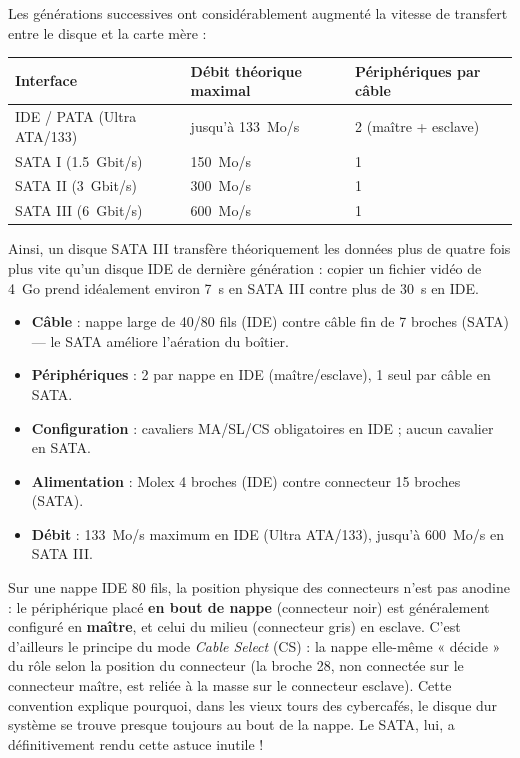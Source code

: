 \documentclass[11pt]{article}
\newcounter{popsec}
\newcounter{popsub}
\newcommand{\courssub}[1]{%
  \stepcounter{popsub}%
  \par\vspace{9pt}\noindent{\popxbold\fontsize{11.5}{13}\selectfont\color{popink}{\color{poporange}\thepopsec.\thepopsub}\hspace{6pt}#1}\par\nopagebreak\vspace{4pt}
}
\begin{document}
\begin{exemplebox}
Les générations successives ont considérablement augmenté la vitesse de transfert entre le disque et la carte mère :
\begin{center}
\begin{tabularx}{\linewidth}{|l|X|l|}
\hline
\rowcolor{popblueL} \textbf{Interface} & \textbf{Débit théorique maximal} & \textbf{Périphériques par câble} \\
\hline
IDE / PATA (Ultra ATA/133) & jusqu'à \SI{133}{Mo/s} & 2 (maître + esclave) \\
\hline
SATA I (\SI{1,5}{Gbit/s}) & \SI{150}{Mo/s} & 1 \\
\hline
SATA II (\SI{3}{Gbit/s}) & \SI{300}{Mo/s} & 1 \\
\hline
SATA III (\SI{6}{Gbit/s}) & \SI{600}{Mo/s} & 1 \\
\hline
\end{tabularx}
\end{center}
Ainsi, un disque SATA III transfère théoriquement les données plus de quatre fois plus vite qu'un disque IDE de dernière génération : copier un fichier vidéo de \SI{4}{Go} prend idéalement environ \SI{7}{s} en SATA III contre plus de \SI{30}{s} en IDE.
\end{exemplebox}

\courssub{Comparaison synthétique IDE / SATA}

\begin{aretenir}
\begin{itemize}
\item \textbf{Câble} : nappe large de 40/80 fils (IDE) contre câble fin de 7 broches (SATA) — le SATA améliore l'aération du boîtier.
\item \textbf{Périphériques} : 2 par nappe en IDE (maître/esclave), 1 seul par câble en SATA.
\item \textbf{Configuration} : cavaliers MA/SL/CS obligatoires en IDE ; aucun cavalier en SATA.
\item \textbf{Alimentation} : Molex 4 broches (IDE) contre connecteur 15 broches (SATA).
\item \textbf{Débit} : \SI{133}{Mo/s} maximum en IDE (Ultra ATA/133), jusqu'à \SI{600}{Mo/s} en SATA III.
\end{itemize}
\end{aretenir}

\begin{savaistu}
Sur une nappe IDE 80 fils, la position physique des connecteurs n'est pas anodine : le périphérique placé \textbf{en bout de nappe} (connecteur noir) est généralement configuré en \textbf{maître}, et celui du milieu (connecteur gris) en esclave. C'est d'ailleurs le principe du mode \emph{Cable Select} (CS) : la nappe elle-même « décide » du rôle selon la position du connecteur (la broche 28, non connectée sur le connecteur maître, est reliée à la masse sur le connecteur esclave). Cette convention explique pourquoi, dans les vieux tours des cybercafés, le disque dur système se trouve presque toujours au bout de la nappe. Le SATA, lui, a définitivement rendu cette astuce inutile !
\end{savaistu}
\end{document}
